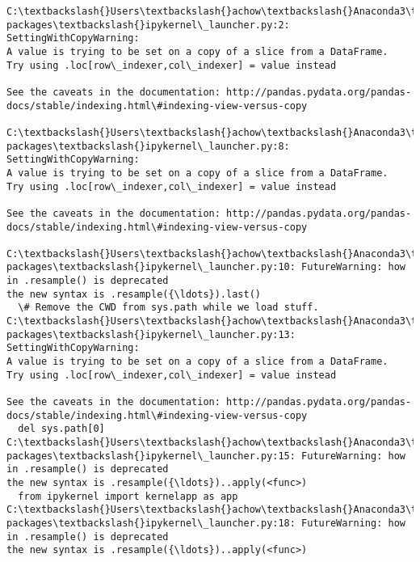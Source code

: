 \documentclass[11pt]{article}
\begin{document}
    \begin{Verbatim}[commandchars=\\\{\}]
C:\textbackslash{}Users\textbackslash{}achow\textbackslash{}Anaconda3\textbackslash{}lib\textbackslash{}site-packages\textbackslash{}ipykernel\_launcher.py:2: SettingWithCopyWarning: 
A value is trying to be set on a copy of a slice from a DataFrame.
Try using .loc[row\_indexer,col\_indexer] = value instead

See the caveats in the documentation: http://pandas.pydata.org/pandas-docs/stable/indexing.html\#indexing-view-versus-copy
  
C:\textbackslash{}Users\textbackslash{}achow\textbackslash{}Anaconda3\textbackslash{}lib\textbackslash{}site-packages\textbackslash{}ipykernel\_launcher.py:8: SettingWithCopyWarning: 
A value is trying to be set on a copy of a slice from a DataFrame.
Try using .loc[row\_indexer,col\_indexer] = value instead

See the caveats in the documentation: http://pandas.pydata.org/pandas-docs/stable/indexing.html\#indexing-view-versus-copy
  
C:\textbackslash{}Users\textbackslash{}achow\textbackslash{}Anaconda3\textbackslash{}lib\textbackslash{}site-packages\textbackslash{}ipykernel\_launcher.py:10: FutureWarning: how in .resample() is deprecated
the new syntax is .resample({\ldots}).last()
  \# Remove the CWD from sys.path while we load stuff.
C:\textbackslash{}Users\textbackslash{}achow\textbackslash{}Anaconda3\textbackslash{}lib\textbackslash{}site-packages\textbackslash{}ipykernel\_launcher.py:13: SettingWithCopyWarning: 
A value is trying to be set on a copy of a slice from a DataFrame.
Try using .loc[row\_indexer,col\_indexer] = value instead

See the caveats in the documentation: http://pandas.pydata.org/pandas-docs/stable/indexing.html\#indexing-view-versus-copy
  del sys.path[0]
C:\textbackslash{}Users\textbackslash{}achow\textbackslash{}Anaconda3\textbackslash{}lib\textbackslash{}site-packages\textbackslash{}ipykernel\_launcher.py:15: FutureWarning: how in .resample() is deprecated
the new syntax is .resample({\ldots})..apply(<func>)
  from ipykernel import kernelapp as app
C:\textbackslash{}Users\textbackslash{}achow\textbackslash{}Anaconda3\textbackslash{}lib\textbackslash{}site-packages\textbackslash{}ipykernel\_launcher.py:18: FutureWarning: how in .resample() is deprecated
the new syntax is .resample({\ldots})..apply(<func>)

    \end{Verbatim}
\end{document}
